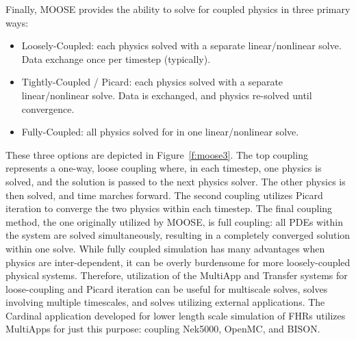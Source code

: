 Finally, MOOSE provides the ability to solve for coupled physics in three primary ways:
\begin{itemize}
\item Loosely-Coupled: each physics solved with a separate linear/nonlinear solve. Data exchange once per
timestep (typically).
\item Tightly-Coupled / Picard: each physics solved with a separate linear/nonlinear solve. Data is exchanged, and physics re-solved until convergence.
\item Fully-Coupled: all physics solved for in one linear/nonlinear solve.
\end{itemize}
These three options are depicted in Figure~\ref{f:moose3}. The top coupling represents a one-way, loose coupling where, in each timestep, one physics is solved, and the solution is passed to the next physics solver. The other physics is then solved, and time marches forward. The second coupling utilizes Picard iteration to converge the two physics within each timestep. The final coupling method, the one originally utilized by MOOSE, is full coupling: all PDEs within the system are solved simultaneously, resulting in a completely converged solution within one solve. While fully coupled simulation has many advantages when physics are inter-dependent, it can be
overly burdensome for more loosely-coupled physical systems. Therefore, utilization of the MultiApp and Transfer systems for loose-coupling and Picard iteration can be useful for multiscale solves, solves involving multiple timescales, and solves utilizing external applications. The Cardinal application developed for lower length scale simulation of FHRs utilizes MultiApps for just this purpose: coupling Nek5000, OpenMC, and BISON.

